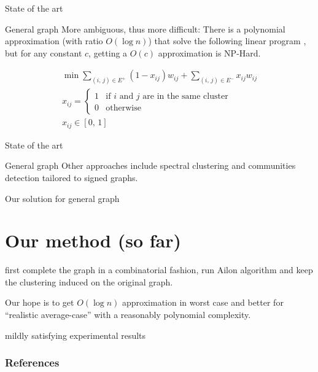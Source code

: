\documentclass[xcolor=svgnames,slideopt,A4,handout]{beamer}
\begin{document}
\begin{frame}{State of the art}
	\begin{block}{General graph}
		More ambiguous, thus more difficult: There is a polynomial
		approximation (with ratio $O(\log n)$) that solve the following linear
		program \autocite{Demaine2006}, but for any constant $c$, getting a
		$O(c)$ approximation is NP-Hard.

		\begin{align*}
			\min \sum_{(i,\, j)\in E^+} (1-x_{ij}) w_{ij} +
			\sum_{(i,\, j)\in E^-} x_{ij} w_{ij} \\
			x_{ij} =   \begin{cases}
				1 & \text{if $i$ and $j$ are in the same cluster} \\
				0       & \text{otherwise}
			\end{cases} \\
			x_{ij} \in [0,\,1]
		\end{align*}
	\end{block}

\end{frame}
\begin{frame}{State of the art}
	\begin{block}{General graph}
Other approaches include spectral clustering \autocite{Luca10} and communities
detection \autocite{Yang2007} tailored to signed graphs.
	\end{block}
\end{frame}

\begin{frame}{Our solution for general graph}
	\section{Our method (so far)}
	first complete the graph in a combinatorial fashion, run Ailon algorithm
	and keep the clustering induced on the original graph.

	Our hope is to get $O(\log n)$ approximation in worst case and better for
	\enquote{realistic average-case} \autocite{Makarychev2014} with a
	reasonably polynomial complexity.

	mildly satisfying experimental results
\end{frame}
\appendix
\begin{frame}[t,allowframebreaks]
	\frametitle{References}
	\printbibliography
\end{frame}

\end{document}
